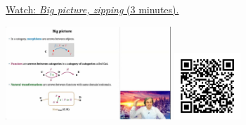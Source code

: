 
\begin{minipage}{10cm}
    \href{https://act4e-spring21.netlify.app/videos/spring2021-functors:bigpic.html}{Watch: \emph{Big picture, zipping} (3 minutes).}
        
    \href{https://act4e-spring21.netlify.app/videos/spring2021-functors:bigpic.html}{\includegraphics[height=3.5cm]{spring2021-functors:bigpic/thumbnails.jpg}}
    \href{https://act4e-spring21.netlify.app/videos/spring2021-functors:bigpic.html}{\includegraphics[height=2.5cm]{spring2021-functors:bigpic/qrcode.png}}
\end{minipage}
